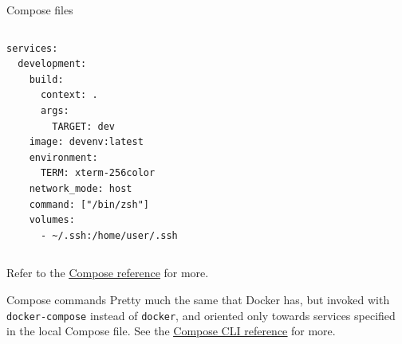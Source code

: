 \begin{frame}[fragile]{Compose files}
	\begin{columns}
		\begin{lstlisting}[language=compose, caption=Minimal example of a Compose file.]
services:
  development:
    build:
      context: .
      args:
        TARGET: dev
    image: devenv:latest
    environment:
      TERM: xterm-256color
    network_mode: host
    command: ["/bin/zsh"]
    volumes:
      - ~/.ssh:/home/user/.ssh
\end{lstlisting}
	\end{columns}
	Refer to the \href{https://docs.docker.com/compose/compose-file/}{\color{blue}\underline{Compose reference}} for more.
\end{frame}

\begin{frame}{Compose commands}
	Pretty much the same that Docker has, but invoked with
  \newline\newline
	\texttt{docker-compose}
  \newline\newline
	instead of \texttt{docker}, and oriented only towards services specified in the local Compose file.
  \newline\newline
	See the \href{https://docs.docker.com/compose/reference/}{\color{blue}\underline{Compose CLI reference}} for more.
\end{frame}
